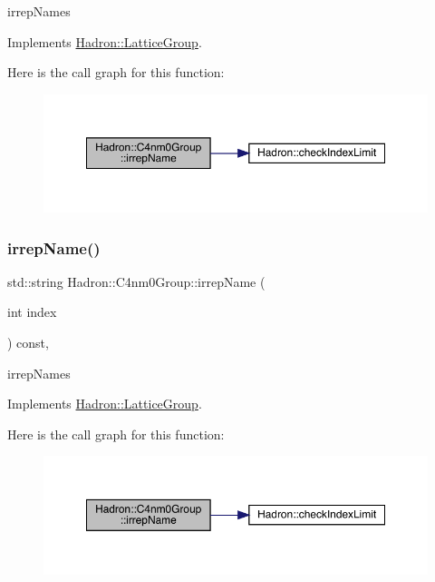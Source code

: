 irrep\+Names 

Implements \mbox{\hyperlink{structHadron_1_1LatticeGroup_a4bc5620218c2a73157e19bc4451fe746}{Hadron\+::\+Lattice\+Group}}.

Here is the call graph for this function\+:
\nopagebreak
\begin{figure}[H]
\begin{center}
\leavevmode
\includegraphics[width=350pt]{da/da1/structHadron_1_1C4nm0Group_ae7e7c420d17cacaed69a74902af72dcc_cgraph}
\end{center}
\end{figure}
\mbox{\label{structHadron_1_1C4nm0Group_ae7e7c420d17cacaed69a74902af72dcc}} 
\subsubsection{\texorpdfstring{irrepName()}{irrepName()}\hspace{0.1cm}{\footnotesize\ttfamily [3/3]}}
{\footnotesize\ttfamily std\+::string Hadron\+::\+C4nm0\+Group\+::irrep\+Name (\begin{DoxyParamCaption}\item[{int}]{index }\end{DoxyParamCaption}) const\hspace{0.3cm}{\ttfamily [inline]}, {\ttfamily [virtual]}}

irrep\+Names 

Implements \mbox{\hyperlink{structHadron_1_1LatticeGroup_a4bc5620218c2a73157e19bc4451fe746}{Hadron\+::\+Lattice\+Group}}.

Here is the call graph for this function\+:
\nopagebreak
\begin{figure}[H]
\begin{center}
\leavevmode
\includegraphics[width=350pt]{da/da1/structHadron_1_1C4nm0Group_ae7e7c420d17cacaed69a74902af72dcc_cgraph}
\end{center}
\end{figure}
\mbox{\label{structHadron_1_1C4nm0Group_a45599b94fa4633619247f4827e03ca23}} 
